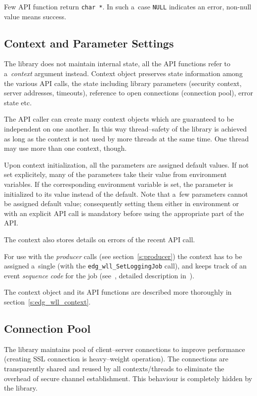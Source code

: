 Few API function return \lstinline'char *'. In such a~case
\lstinline'NULL' indicates an error, non-null value means success.

\subsection{Context and Parameter Settings}
\label{s:context}

The \LB library does not maintain internal state, all the API
functions refer to a~\emph{context} argument instead.
Context object preserves state information among the various API
calls, the state including \LB library parameters (\eg security
context, server addresses, timeouts), reference to open connections
(connection pool), error state etc.

The API caller can create many context objects which are guaranteed
to be independent on one another. In this way thread--safety of the
library is achieved as long as the context is not used by more threads
at the same time. One thread may use more than one context, though.

Upon context initialization, all the parameters are assigned default
values. If not set explicitely, many of the parameters take their
value from environment variables. If the corresponding environment
variable is set, the parameter is initialized to its value instead of
the default. Note that a~few parameters cannot be assigned default
value; consequently setting them either in environment or with an
explicit API call is mandatory before using the appropriate part of
the API.

The context also stores details on errors of the recent API call.

For use with the \emph{producer} calls (see section~\ref{s:producer})
the context has to be assigned a~single \jobid (with the
\lstinline'edg_wll_SetLoggingJob' call), and keeps track of an event
\emph{sequence code} for the job (see~\cite{lbug}, detailed
description in~\cite{lbarch}).

The context object and its API functions are described more thoroughly
in section~\ref{s:edg_wll_context}.

\subsection{Connection Pool}
The \LB library maintains pool of client--server connections to
improve performance (creating SSL connection is heavy--weight
operation). The connections are transparently shared and reused by all
contexts/threads to eliminate the overhead of secure channel
establishment. This behaviour is completely hidden by the library.

